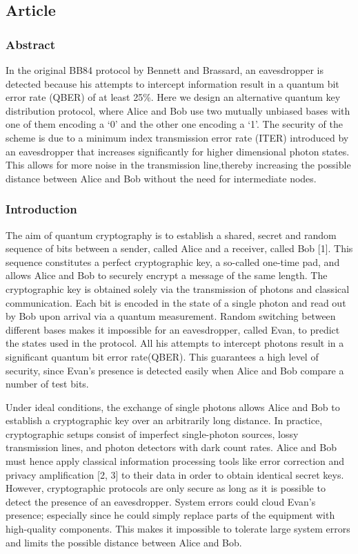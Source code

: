\subsection{Article}

\subsubsection*{Abstract}

In the original BB84 protocol by Bennett and Brassard, an eavesdropper is detected because his attempts to intercept information result in a quantum bit error rate (QBER) of at least 25\%. Here we design an alternative quantum key distribution protocol, where Alice and Bob use two mutually unbiased bases with one of them encoding a ‘0’ and the other one encoding a ‘1’. The security of the scheme is due to a minimum index transmission error rate (ITER) introduced by an eavesdropper that increases significantly for higher dimensional photon states. This allows for more noise in the transmission line,thereby increasing the possible distance between Alice and Bob without the need for intermediate nodes.

\subsubsection{Introduction}

The aim of quantum cryptography is to establish a shared, secret and random sequence of bits between a sender, called Alice and a receiver, called Bob [1]. This sequence constitutes a perfect cryptographic key, a so-called one-time pad, and allows Alice and Bob to securely encrypt a message of the same length. The cryptographic key is obtained solely via the transmission of photons and classical communication. Each bit is encoded in the state of a single photon and read out by Bob upon arrival via a quantum measurement. Random switching between different bases makes it impossible for an eavesdropper, called Evan, to predict the states used in the protocol. All his attempts to intercept photons result in a significant quantum bit error rate(QBER). This guarantees a high level of security, since Evan’s presence is detected easily when Alice and Bob compare a number of test bits.

Under ideal conditions, the exchange of single photons allows Alice and Bob to establish a cryptographic key over an arbitrarily long distance. In practice, cryptographic setups consist of imperfect single-photon sources, lossy transmission lines, and photon detectors with dark count rates. Alice and Bob must hence apply classical information processing tools like error correction and privacy amplification [2, 3] to their data in order to obtain identical secret keys. However, cryptographic protocols are only secure as long as it is possible to detect the presence of an eavesdropper. System errors could cloud Evan’s presence; especially since he could simply replace parts of the equipment with high-quality components. This makes it impossible to tolerate large system errors and limits the possible distance between Alice and Bob.

